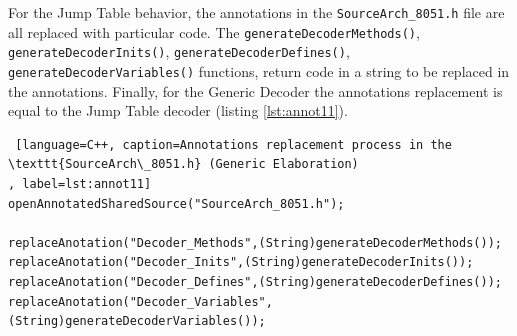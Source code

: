 For the Jump Table behavior, the annotations in the \texttt{SourceArch\_8051.h} file are all replaced with particular code. The \texttt{generateDecoderMethods()}, \texttt{generateDecoderInits()}, \texttt{generateDecoderDefines()}, \texttt{generateDecoderVariables()} functions, return code in a string to be replaced in the annotations. Finally, for the Generic Decoder the annotations replacement is equal to the Jump Table decoder (listing \ref{lst:annot11}).

\begin{lstlisting} [language=C++, caption=Annotations replacement process in the \texttt{SourceArch\_8051.h} (Generic Elaboration)
, label=lst:annot11]
openAnnotatedSharedSource("SourceArch_8051.h");
		
replaceAnotation("Decoder_Methods",(String)generateDecoderMethods());
replaceAnotation("Decoder_Inits",(String)generateDecoderInits());
replaceAnotation("Decoder_Defines",(String)generateDecoderDefines());
replaceAnotation("Decoder_Variables",(String)generateDecoderVariables());
\end{lstlisting}


